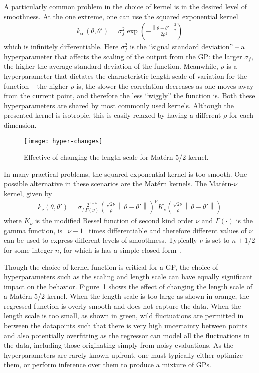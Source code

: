 A particularly common problem in the choice of kernel is in the desired level
of smoothness.  At the one extreme, one can use the squared exponential kernel
\begin{align}
\label{eq:opt:se-kernel}
k_{\text{se}} \left(\theta,\theta'\right) = \sigma_f^2 \exp \left(-\frac{\left\lVert \theta - \theta'\right\rVert^2_2}{2 \rho^2}\right)
\end{align}
which is infinitely differentiable.   Here $\sigma_f^2$ is the ``signal 
standard deviation'' -- a hyperparameter that
affects the scaling of the output from the GP: the larger $\sigma_f$, the higher
the average standard deviation of the function.  Meanwhile, $\rho$ is a hyperparameter
that dictates the characteristic length scale of variation for the function -- the
higher $\rho$ is, the slower the correlation decreases as one moves away from the
current point, and therefore the less ``wiggly'' the function is.  Both these
hyperparameters are shared by most commonly used kernels.  Although the
presented kernel is isotropic, this is easily relaxed by having a different $\rho$
for each dimension.

\begin{figure}[t]
	\centering
	\texttt{[image: hyper-changes]}
	\caption{Effective of changing the length scale for Mat\'{e}rn-5/2 kernel.\label{fig:opt:hyper-changes}}
\end{figure}

In many practical problems, the squared exponential kernel is too smooth.
One possible alternative in these scenarios are the Mat\'{e}rn kernels.  The
Mat\'{e}rn-$\nu$ kernel, given by
\begin{align}
k_{\nu}\left(\theta,\theta'\right) = \sigma_f \frac{2^{1-\nu}}{\Gamma\left(\nu\right)}\left(\frac{\sqrt{2\nu}}{\rho}\left\lVert\theta-\theta'\right\rVert\right)^{\nu} K_\nu
 \left(\frac{\sqrt{2\nu}}{\rho}\left\lVert\theta-\theta'\right\rVert\right)
\end{align}
where $K_{\nu}$ is the modified Bessel function of second kind order $\nu$
and $\Gamma(\cdot)$ is the gamma function,
is $\lfloor\nu-1\rfloor$ times differentiable and
therefore different values of $\nu$ can be used to express different levels
of smoothness.  Typically $\nu$ is set to $n+1/2$ for some integer $n$, for
which is has a simple closed form~\citep{rasmussen2006gaussian}.

Though the choice of kernel function is critical for a GP, the choice of
hyperparameters such as the scaling and length scale can have equally
significant impact on the behavior.  Figure~\ref{fig:opt:hyper-changes} shows
the effect of changing the length scale of a Mat\'{e}rn-5/2 kernel.  When the length
scale is too large as shown in orange, the regressed function is overly smooth and
does not capture the data.  When the length scale is too small, as shown in green,
wild fluctuations are permitted in between the datapoints such that there is very
high uncertainty between points and also potentially overfitting as the regressor
can model all the fluctuations in the data, including those originating simply from
noisy evaluations.
As the hyperparameters are rarely known upfront, one must typically either optimize
them, or perform inference over them to produce a mixture of GPs.

